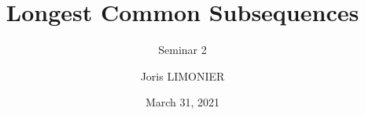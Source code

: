 \documentclass{beamer}
\title{Longest Common Subsequences}
\subtitle{Seminar 2}
\author{Joris LIMONIER}
\institute{University of Luxembourg}
\date{March 31, 2021}
\begin{document}
\begin{frame}
    \titlepage
\end{frame}

\begin{frame}
\end{frame}

\begin{frame}
\end{frame}

\begin{frame}
\end{frame}

\begin{frame}
\end{frame}
\end{document}
